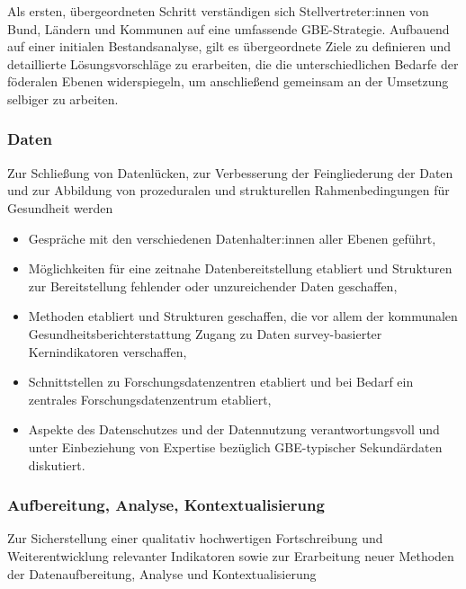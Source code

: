 \documentclass{article}
\begin{document}
Als ersten, übergeordneten Schritt verständigen sich Stellvertreter:innen von Bund, Ländern und Kommunen auf eine umfassende GBE-Strategie. Aufbauend auf einer initialen Bestandsanalyse, gilt es übergeordnete Ziele zu definieren und detaillierte Lösungsvorschläge zu erarbeiten, die die unterschiedlichen Bedarfe der föderalen Ebenen widerspiegeln, um anschließend gemeinsam an der Umsetzung selbiger zu arbeiten.


\subsubsection{Daten}\label{H6252375}



Zur Schließung von Datenlücken, zur Verbesserung der Feingliederung der Daten und zur Abbildung von prozeduralen und strukturellen Rahmenbedingungen für Gesundheit werden

\begin{itemize}
\item Gespräche mit den verschiedenen Datenhalter:innen aller Ebenen geführt,


\item Möglichkeiten für eine zeitnahe Datenbereitstellung etabliert und Strukturen zur Bereitstellung fehlender oder unzureichender Daten geschaffen,


\item Methoden etabliert und Strukturen geschaffen, die vor allem der kommunalen Gesundheitsberichterstattung Zugang zu Daten survey-basierter Kernindikatoren verschaffen,


\item Schnittstellen zu Forschungsdatenzentren etabliert und bei Bedarf ein zentrales Forschungsdatenzentrum etabliert,


\item Aspekte des Datenschutzes und der Datennutzung verantwortungsvoll und unter Einbeziehung von Expertise bezüglich GBE-typischer Sekundärdaten diskutiert.


\end{itemize}

\subsubsection{Aufbereitung, Analyse, Kontextualisierung}\label{H4922749}



Zur Sicherstellung einer qualitativ hochwertigen Fortschreibung und Weiterentwicklung relevanter Indikatoren sowie zur Erarbeitung neuer Methoden der Datenaufbereitung, Analyse und Kontextualisierung
\end{document}
